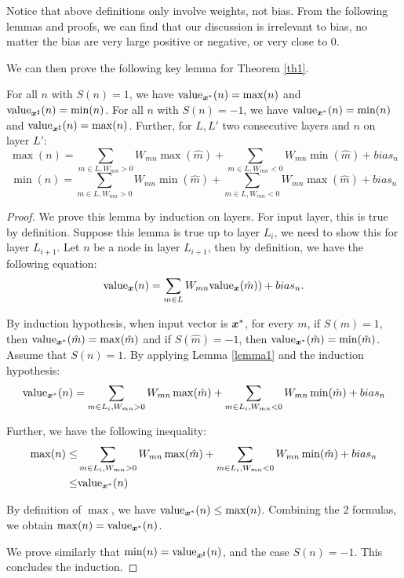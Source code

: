 {\color{red}Notice that above definitions only involve weights, not bias. From the following lemmas and proofs, we can find that our discussion is irrelevant to bias, no matter the bias are very large positive or negative, or very close to 0.}

We can then prove the following key lemma for Theorem \ref{th1}.

\begin{lemma}
	\label{lem:key1}
	\label{lemma2}
For all $n$ with $S(n)=1$, we have ${\textrm{value}}_{\boldsymbol{x}^*}(n) = \max(n)$
and ${\textrm{value}}_{\boldsymbol{x}^{\sharp}}(n) = \min(n)$.
For all $n$ with $S(n)=-1$, we have ${\textrm{value}}_{\boldsymbol{x}^*}(n) = \min(n)$
and ${\textrm{value}}_{\boldsymbol{x}^{\sharp}}(n) = \max(n)$. Further, for $L,L'$ two consecutive layers and $n$ on layer $L'$:
$$\max(n)=\sum_{m \in L, W_{mn}>0}W_{mn} \max(\hat{m}) + \sum_{m \in L, W_{mn}<0}W_{mn} \min(\hat{m}) + bias_n$$
$$\min(n)=\sum_{m \in L, W_{mn}>0}W_{mn} \min(\hat{m}) + \sum_{m \in L, W_{mn}<0}W_{mn} \max(\hat{m}) + bias_n$$

\end{lemma}

\begin{proof}
	We prove this lemma by induction on layers. For input layer, this is true by definition. Suppose this lemma is true up to layer $L_i$, we need to show this for layer $L_{i+1}$. Let $n$ be a node in layer $L_{i+1}$, then by definition, we have the following equation: \begin{align*}
		{\textrm{value}}_{\boldsymbol{x}}(n) = \sum_{m\in L}W_{m n}{\textrm{value}}_{\boldsymbol{x}}(\hat{m})) + bias_n.
	\end{align*}
	
	By induction hypothesis, when input vector is $\boldsymbol{x}^{*}$, for every $m$, if $S(m)=1$, then ${\textrm{value}}_{\boldsymbol{x}^*}(\hat{m})=\max(\hat{m})$ and if $S(\hat{m})=-1$, then ${\textrm{value}}_{\boldsymbol{x}^*}(\hat{m})=\min(\hat{m})$. Assume that $S(n)=1$. By applying Lemma \ref{lemma1} and the induction hypothesis:
	\begin{align*}
		{\textrm{value}}_{\boldsymbol{x}^*}(n) = \sum_{m \in L_i, W_{mn}>0}W_{mn} \max(\hat{m}) + \sum_{m \in L_i, W_{mn}<0}W_{mn} \min(\hat{m}) + bias_n\\
	\end{align*}
	


	Further, we have the following inequality:
	\begin{align*}
		\max(n)\leq & \sum_{m \in L_i, W_{mn }>0}W_{mn} \max(\hat{m}) + \sum_{m \in L_i, W_{mn}<0}W_{mn} \min(\hat{m}) + bias_n\\
		\leq & {\textrm{value}}_{\boldsymbol{x}^*}(n)
	\end{align*}
	
	
	By definition of $\max$, we have ${\textrm{value}}_{\boldsymbol{x}^*}(n) \leq \max(n)$.
	Combining the 2 formulas, we obtain $\max(n)={\textrm{value}}_{\boldsymbol{x}^*}(n)$. 
	
	We prove similarly that $\min(n)={\textrm{value}}_{\boldsymbol{x}^\sharp}(n)$,
	and the case $S(n)=-1$. This concludes the induction. 
\end{proof}


